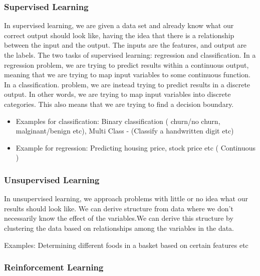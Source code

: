 \documentclass[11pt]{article}
\providecommand{\tightlist}{%
      \setlength{\itemsep}{0pt}\setlength{\parskip}{0pt}}
\begin{document}
    \hypertarget{supervised-learning}{%
\subsubsection{Supervised Learning}\label{supervised-learning}}

    In supervised learning, we are given a data set and already know what
our correct output should look like, having the idea that there is a
relationship between the input and the output. The inputs are the
features, and output are the labels. The two tasks of supervised
learning: regression and classification. In a regression problem, we are
trying to predict results within a continuous output, meaning that we
are trying to map input variables to some continuous function. In a
classification. problem, we are instead trying to predict results in a
discrete output. In other words, we are trying to map input variables
into discrete categories. This also means that we are trying to find a
decision boundary.

    \begin{itemize}
\tightlist
\item
  Examples for classification: Binary classification ( churn/no churn,
  malginant/benign etc), Multi Class - (Classify a handwritten digit
  etc)
\item
  Example for regression: Predicting housing price, stock price etc (
  Continuous )
\end{itemize}

    \hypertarget{unsupervised-learning}{%
\subsubsection{Unsupervised Learning}\label{unsupervised-learning}}

    In unsupervised learning, we approach problems with little or no idea
what our results should look like. We can derive structure from data
where we don't necessarily know the effect of the variables.We can
derive this structure by clustering the data based on relationships
among the variables in the data.

    Examples: Determining different foods in a basket based on certain
features etc

    \hypertarget{reinforcement-learning}{%
\subsubsection{Reinforcement Learning}\label{reinforcement-learning}}
\end{document}
